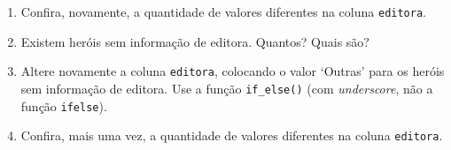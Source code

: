\documentclass[
  11pt]{report}
\begin{document}
\begin{enumerate}

\item
  Confira, novamente, a quantidade de valores diferentes na coluna \texttt{editora}.

\item
  Existem heróis sem informação de editora. Quantos? Quais são?

\item
  Altere novamente a coluna \texttt{editora}, colocando o valor `Outras' para os heróis sem informação de editora. Use a função \texttt{if\_else()} (com \emph{underscore}, não a função \texttt{ifelse}).

\item
  Confira, mais uma vez, a quantidade de valores diferentes na coluna \texttt{editora}.

\end{enumerate}
\end{document}
